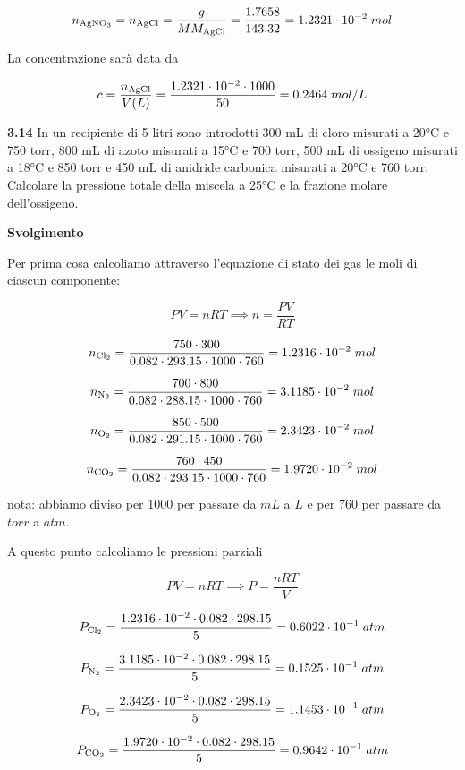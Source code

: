 $$n_{\rm AgNO_3}=n_{\rm AgCl}=\frac{g}{MM_{\rm AgCl}}
=\frac{1.7658}{143.32}=1.2321 \cdot 10^{-2}\;mol$$

La concentrazione sarà data da

$$c=\frac{n_{\rm AgCl}}{V(L)}
=\frac{1.2321 \cdot 10^{-2} \cdot 1000}{50}
=0.2464\;mol/L$$

\vspace{0.2cm}\textbf{3.14} In un recipiente di 5 litri sono introdotti 300 mL di cloro misurati a 20°C e 750 torr, 800 mL di azoto misurati a 15°C e 700 torr, 500 mL di ossigeno misurati a 18°C e 850 torr e 450 mL di anidride carbonica misurati a 20°C e 760 torr. Calcolare la pressione totale della miscela a 25°C e la frazione molare dell'ossigeno.

\vspace{0.2cm}\large\textbf{Svolgimento}\normalsize

\vspace{0.2cm}Per prima cosa calcoliamo attraverso l'equazione di stato dei gas le moli di ciascun componente:

$$PV=nRT \implies n=\frac{PV}{RT}$$

$$n_{\rm Cl_2}=\frac{750 \cdot 300}{0.082 \cdot 293.15 \cdot 1000 \cdot 760}=1.2316 \cdot 10^{-2}\;mol$$

$$n_{\rm N_2}=\frac{700 \cdot 800}{0.082 \cdot 288.15 \cdot 1000 \cdot 760}=3.1185 \cdot 10^{-2}\;mol$$

$$n_{\rm O_2}=\frac{850 \cdot 500}{0.082 \cdot 291.15 \cdot 1000 \cdot 760}=2.3423 \cdot 10^{-2}\;mol$$

$$n_{\rm CO_2}=\frac{760 \cdot 450}{0.082 \cdot 293.15 \cdot 1000 \cdot 760}=1.9720 \cdot 10^{-2}\;mol$$

nota: abbiamo diviso per 1000 per passare da $mL$ a $L$ e per 760 per passare da $torr$ a $atm$.

A questo punto calcoliamo le pressioni parziali

$$PV=nRT \implies P=\frac{nRT}{V}$$

$$P_{\rm Cl_2}=\frac{1.2316 \cdot 10^{-2} \cdot 0.082 \cdot 298.15}{5}=0.6022 \cdot 10^{-1}\;atm$$

$$P_{\rm N_2}=\frac{3.1185 \cdot 10^{-2} \cdot 0.082 \cdot 298.15}{5}=0.1525 \cdot 10^{-1}\;atm$$

$$P_{\rm O_2}=\frac{2.3423 \cdot 10^{-2} \cdot 0.082 \cdot 298.15}{5}=1.1453 \cdot 10^{-1}\;atm$$

$$P_{\rm CO_2}=\frac{1.9720 \cdot 10^{-2} \cdot 0.082 \cdot 298.15}{5}=0.9642 \cdot 10^{-1}\;atm$$

